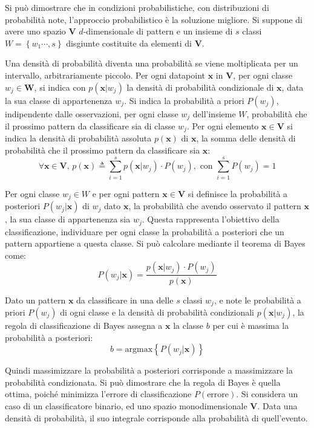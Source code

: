 \documentclass{article}
\numberwithin{equation}{subsection}
\newcommand{\vect}[1]{\boldsymbol{\mathbf{#1}}}
\begin{document}
Si può dimostrare che in condizioni probabilistiche, con distribuzioni di probabilità note, 
l'approccio probabilistico è la soluzione migliore. 
Si suppone di avere uno spazio $\vect{V}$ $d$-dimensionale di pattern e un insieme di $s$ classi $W=\left\{w_1\cdots,s\right\}$ disgiunte costituite da elementi di $\vect{V}$. 

Una densità di probabilità diventa una probabilità se viene moltiplicata per un intervallo, 
arbitrariamente piccolo. 
Per ogni datapoint $\vect{x}$ in $\vect{V}$, per ogni classe $w_j\in\vect{W}$, si indica con $p(\vect{x}|w_j)$ la densità di probabilità condizionale di $\vect{x}$, data la sua classe di appartenenza $w_j$. Si indica la probabilità a priori $P(w_j)$, indipendente dalle osservazioni, per ogni classe $w_j$ dell'insieme $W$, probabilità che il prossimo pattern da classificare sia di classe $w_j$. 
Per ogni elemento $\vect{x}\in\vect{V}$ si indica la densità di probabilità assoluta $p(\vect{x})$ di $\vect{x}$, la somma delle densità di probabilità che il prossimo pattern da classificare sia $\vect{x}$:
\begin{equation}
    \forall\vect{x}\in\vect{V},\,p(\vect{x})\triangleq\displaystyle\sum_{i=1}^sp(\vect{x}|w_j)\cdot P(w_j),\text{ con }\sum_{i=1}^sP(w_j)=1
\end{equation}

Per ogni classe $w_j\in W$ e per ogni pattern $\vect{x}\in\vect{V}$ si definisce la probabilità a posteriori $P(w_j|\vect{x})$ di $w_j$ dato $\vect{x}$, la probabilità che avendo osservato il pattern $\vect{x}$, la sua classe di appartenenza sia $w_j$. Questa rappresenta l'obiettivo della classificazione, individuare per ogni classe la probabilità a posteriori che un pattern appartiene a questa classe. 
Si può calcolare mediante il teorema di Bayes come:
\begin{equation}
    P(w_j|\vect{x})=\displaystyle\frac{p(\vect{x}|w_j)\cdot P(w_j)}{p(\vect{x})}
\end{equation}

Dato un pattern $\vect{x}$ da classificare in una delle $s$ classi $w_j$, e note le probabilità a priori $P(w_j)$ di ogni classe e la densità di probabilità condizionali $p(\vect{x}|w_j)$, la regola di classificazione di Bayes assegna a $\vect{x}$ la classe $b$ per cui è massima la probabilità a posteriori:
\begin{equation}
    b=\text{argmax}\left\{P(w_j|\vect{x})\right\}
\end{equation}

Quindi massimizzare la probabilità a posteriori corrisponde a massimizzare la probabilità condizionata. Si può dimostrare che la regola di Bayes è quella ottima, poiché minimizza l'errore di classificazione $P(\text{errore})$. Si considera un caso di un classificatore binario, ed uno spazio monodimensionale $\vect{V}$. Data una densità di probabilità, il suo integrale corrisponde alla probabilità di quell'evento. 
\end{document}
